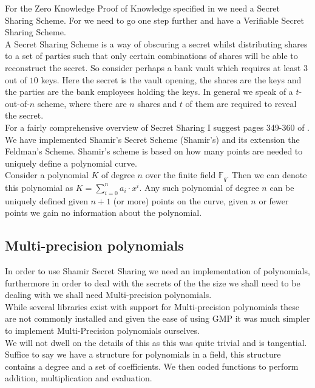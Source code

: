 \documentclass[ %
                    author={Nicholas Tutte},
                supervisor={Prof. Nigel Smart},
                    degree={MEng},
                     title={Secure Two Party Computation},
                  subtitle={A practical comparison of recent protocols},
                      type={Research - GG1K},
                      year={2015} ]{dissertation}
\begin{document}
			For the Zero Knowledge Proof of Knowledge specified in \cite{LindellAndPinkas2011} we need a Secret Sharing Scheme. For \cite{Katz_Symm_CnC_2013} we need to go one step further and have a Verifiable Secret Sharing Scheme.\\

			A Secret Sharing Scheme is a way of obscuring a secret whilst distributing shares to a set of parties such that only certain combinations of shares will be able to reconstruct the secret. So consider perhaps a bank vault which requires at least $3$ out of $10$ keys. Here the secret is the vault opening, the shares are the keys and the parties are the bank employees holding the keys. In general we speak of a $t$-out-of-$n$ scheme, where there are $n$ shares and $t$ of them are required to reveal the secret.\\

			For a fairly comprehensive overview of Secret Sharing I suggest pages 349-360 of \cite{NigelCryptoBook}.\\

			We have implemented Shamir's Secret Scheme (Shamir's) and its extension the Feldman's Scheme. Shamir's scheme is based on how many points are needed to uniquely define a polynomial curve.\\

			Consider a polynomial $K$ of degree $n$ over the finite field $\mathbb{F}_q$. Then we can denote this polynomial as $K = \sum_{i=0}^{n} a_i \cdot x ^ i$. Any such polynomial of degree $n$ can be uniquely defined given $n+1$ (or more) points on the curve, given $n$ or fewer points we gain no information about the polynomial.

			\subsection{Multi-precision polynomials}
				In order to use Shamir Secret Sharing we need an implementation of polynomials, furthermore in order to deal with the secrets of the the size we shall need to be dealing with we shall need Multi-precision polynomials.\\
				
				While several libraries exist with support for Multi-precision polynomials these are not commonly installed and given the ease of using GMP it was much simpler to implement Multi-Precision polynomials ourselves.\\

				We will not dwell on the details of this as this was quite trivial and is tangential. Suffice to say we have a structure for polynomials in a field, this structure contains a degree and a set of coefficients. We then coded functions to perform addition, multiplication and evaluation.
\end{document}
